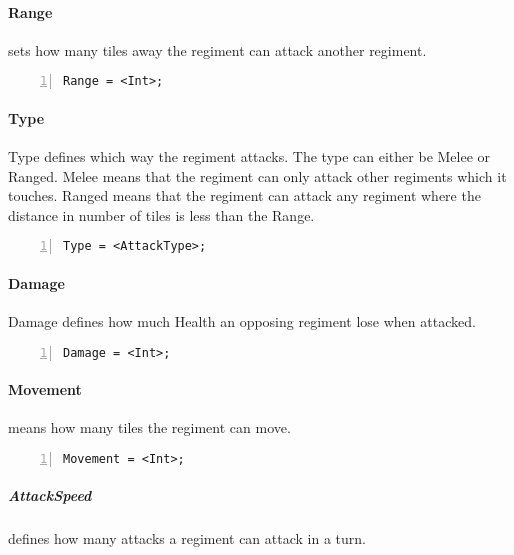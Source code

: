 		\paragraph{Range} sets how many tiles away the regiment can attack another regiment. 
		
\begin{lstlisting}[basicstyle=\small\sffamily,
keywordstyle={\color{blue}},
comment={[l]{//}}, morecomment={[s]{/*}{*/}}, commentstyle=\itshape,
columns={[l]flexible}, numbers=left, numberstyle=\tiny,
frameround=fftt, frame=shadowbox, captionpos=b,
caption={Range}]
Range = <Int>;
\end{lstlisting}
		\paragraph{Type}
			Type defines which way the regiment attacks. The type can either be Melee or Ranged.
			Melee means that the regiment can only attack other regiments which it touches. Ranged means 
			that the regiment can attack any regiment where the distance in number of tiles is less than the Range.

		\begin{lstlisting}[basicstyle=\small\sffamily,
		keywordstyle={\color{blue}},
		comment={[l]{//}}, morecomment={[s]{/*}{*/}}, commentstyle=\itshape,
		columns={[l]flexible}, numbers=left, numberstyle=\tiny,
		frameround=fftt, frame=shadowbox, captionpos=b,
		caption={Type of regiment}]
Type = <AttackType>; 
			\end{lstlisting}	
		\paragraph{Damage}
			Damage defines how much Health an opposing regiment lose when attacked.

		\begin{lstlisting}[basicstyle=\small\sffamily,
		keywordstyle={\color{blue}},
		comment={[l]{//}}, morecomment={[s]{/*}{*/}}, commentstyle=\itshape,
		columns={[l]flexible}, numbers=left, numberstyle=\tiny,
		frameround=fftt, frame=shadowbox, captionpos=b,
		caption={Damage of the regiment}]
Damage = <Int>;
			\end{lstlisting}
		\paragraph{Movement} means how many tiles the regiment can move.

		\begin{lstlisting}[basicstyle=\small\sffamily,
		keywordstyle={\color{blue}},
		comment={[l]{//}}, morecomment={[s]{/*}{*/}}, commentstyle=\itshape,
		columns={[l]flexible}, numbers=left, numberstyle=\tiny,
		frameround=fftt, frame=shadowbox, captionpos=b,
		caption={Movement of the regiment}]
Movement = <Int>;
			\end{lstlisting}
		\subparagraph{AttackSpeed} defines how many attacks a regiment can attack in a turn.

